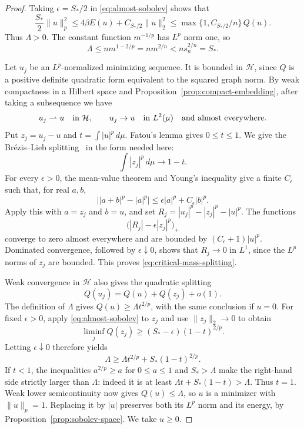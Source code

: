 \documentclass[11pt]{article}
\numberwithin{equation}{section}
\theoremstyle{definition}
\theoremstyle{remark}
\begin{document}
\begin{proof}
Taking $\epsilon=S_*/2$ in \eqref{eq:almost-sobolev} shows that
\[
 \frac{S_*}{2}\|u\|_p^2
 \le4\beta E(u)+C_{S_*/2}\|u\|_2^2
 \le\max\{1,C_{S_*/2}/n\}\,Q(u).
\]
Thus $\Lambda>0$.  The constant function $m^{-1/p}$ has $L^p$ norm
one, so
\begin{equation}
 \Lambda\le n m^{1-2/p}=n m^{2/n}<ns_n^{2/n}=S_*.
 \label{eq:strict-subthreshold}
\end{equation}

Let $u_j$ be an $L^p$-normalized minimizing sequence.  It is bounded
in $\mathcal H$, since $Q$ is a positive definite quadratic form equivalent
to the squared graph norm.  By weak compactness in a Hilbert space
and Proposition~\ref{prop:compact-embedding}, after taking a
subsequence we have
\[
 u_j\rightharpoonup u\quad\hbox{in }\mathcal H,
 \qquad u_j\to u\quad\hbox{in }L^2(\mu)
 \quad\hbox{and almost everywhere}.
\]
Put $z_j=u_j-u$ and $t=\int|u|^p\,d\mu$.  Fatou's lemma gives
$0\le t\le1$. We give the Br\'ezis--Lieb
splitting~\cite[Theorem~1]{BrezisLieb1983} in the form needed here:
\begin{equation}
 \int|z_j|^p\,d\mu\longrightarrow1-t.
 \label{eq:critical-mass-splitting}
\end{equation}
For every $\epsilon>0$, the mean-value theorem and Young's
inequality give a finite $C_\epsilon$ such that, for real $a,b$,
\[
 \bigl||a+b|^p-|a|^p\bigr|
 \le\epsilon|a|^p+C_\epsilon|b|^p.
\]
Apply this with $a=z_j$ and $b=u$, and set
$R_j=|u_j|^p-|z_j|^p-|u|^p$.  The functions
\[
 \bigl(|R_j|-\epsilon|z_j|^p\bigr)_+
\]
converge to zero almost everywhere and are bounded by
$(C_\epsilon+1)|u|^p$.  Dominated convergence, followed by
$\epsilon\downarrow0$, shows that $R_j\to0$ in $L^1$, since the
$L^p$ norms of $z_j$ are bounded.  This proves
\eqref{eq:critical-mass-splitting}.

Weak convergence in $\mathcal H$ also gives the quadratic splitting
\[
 Q(u_j)=Q(u)+Q(z_j)+o(1).
\]
The definition of $\Lambda$ gives $Q(u)\ge\Lambda t^{2/p}$, with
the same conclusion if $u=0$.  For fixed $\epsilon>0$, apply
\eqref{eq:almost-sobolev} to $z_j$ and use $\|z_j\|_2\to0$ to obtain
\[
 \liminf_j Q(z_j)\ge(S_*-\epsilon)(1-t)^{2/p}.
\]
Letting $\epsilon\downarrow0$ therefore yields
\begin{equation}
 \Lambda\ge\Lambda t^{2/p}+S_*(1-t)^{2/p}.
 \label{eq:no-critical-mass-loss}
\end{equation}
If $t<1$, the inequalities $a^{2/p}\ge a$ for $0\le a\le1$ and
$S_*>\Lambda$ make the right-hand side strictly larger than
$\Lambda$: indeed it is at least
$\Lambda t+S_*(1-t)>\Lambda$.  Thus $t=1$.
Weak lower semicontinuity now gives $Q(u)\le\Lambda$, so $u$ is a
minimizer with $\|u\|_p=1$.  Replacing it by $|u|$ preserves both
its $L^p$ norm and its energy, by
Proposition~\ref{prop:sobolev-space}.  We take $u\ge0$.


\end{proof}
\end{document}
